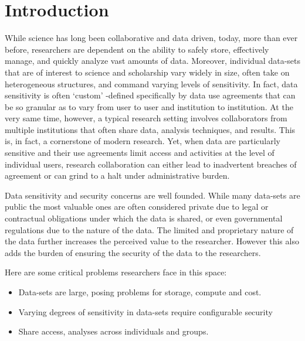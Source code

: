 \section{Introduction}



While science has long been collaborative and data driven, today, more than ever before, researchers are dependent on the ability to safely store, effectively manage, and quickly analyze vast amounts of
data. Moreover, individual data-sets that are of interest to science and scholarship vary widely in size, often take on heterogeneous structures, and command varying levels of sensitivity. In fact, data sensitivity is often `custom' -defined specifically by
data use agreements that can be so granular as to vary from user to user and institution to institution. At the very same time, however, a typical research setting involves collaborators from multiple institutions that often share data, analysis techniques, and results. This is, in fact, a cornerstone of modern research. Yet, when data are particularly sensitive and their use agreements limit access and activities at the level of individual users, research collaboration can either lead to inadvertent breaches of agreement or can grind to a halt under administrative burden.



Data sensitivity and security concerns are well founded. While many data-sets are public the most
valuable ones are often considered private due to legal or contractual obligations under which the data
is shared, or even governmental regulations due to the nature of the data. The limited and proprietary nature
of the data further increases the perceived value to the researcher. However this also adds the burden of
ensuring the security of the data to the researchers.


Here are some critical problems researchers face in this space:

\begin{itemize}
\item Data-sets are large, posing problems for storage, compute and cost.
\item Varying degrees of sensitivity in data-sets require configurable security
\item Share access, analyses across individuals and groups.
\end{itemize}





